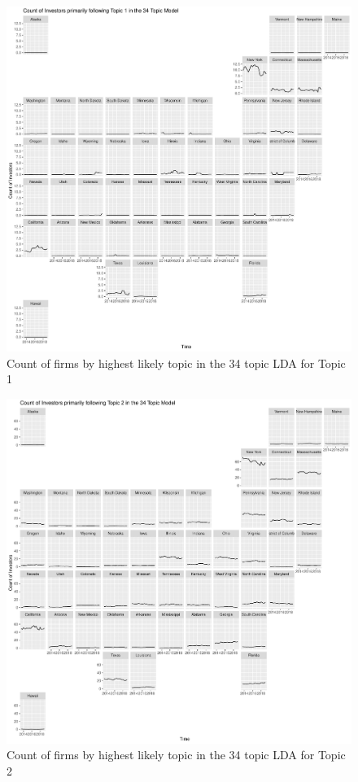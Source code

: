 	\begin{figure}
		\centering
		\includegraphics[width=1\linewidth]{Figures/ChapterV/USA_34_Topic01.pdf}
		\caption[Count of Firms for Topic 1 by Quarter]{Count of firms by highest likely topic in the 34 topic LDA for Topic 1}
		\label{fig:StateLDA1}
	\end{figure}
	
	\begin{figure}
		\centering
		\includegraphics[width=1\linewidth]{Figures/ChapterV/USA_34_Topic02.pdf}
		\caption[Count of Firms for Topic 2 by Quarter]{Count of firms by highest likely topic in the 34 topic LDA for Topic 2}
		\label{fig:StateLDA2}
	\end{figure}
	
